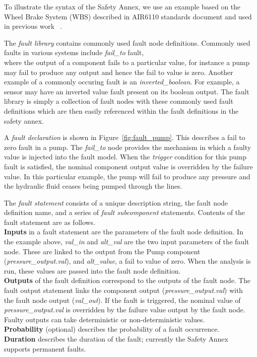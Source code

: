 To illustrate the syntax of the Safety Annex, we use an example based on the Wheel Brake System (WBS) described in AIR6110 standards document and used in  previous work ~\cite{Stewart17:IMBSA, AIR6110}.

The \textit{fault library} contains commonly used fault node definitions. Commonly used faults in various systems include \textit{fail\_to} fault, \\where the output of a component fails to a particular value, for instance a pump may fail to produce any output and hence the fail to value is zero. Another example of a commonly occuring fault is an \textit{inverted\_boolean}. For example, a sensor may have an inverted value fault present on its boolean output. The fault library is simply a collection of fault nodes with these commonly used fault definitions which are then easily referenced within the fault definitions in the safety annex. 


A \textit{fault declaration} is shown in Figure~\ref{fig:fault_pump}. This describes a fail to zero fault in a pump. The \textit{fail\_to} node provides the mechanism in which a faulty value is injected into the fault model. When the \textit{trigger} condition for this pump fault is satisfied, the nominal component output value is overridden by the failure value. In this particular example, the pump will fail to produce any pressure and the hydraulic fluid ceases being pumped through the lines.  

The \textit{fault statement} consists of a unique description string, the fault node definition name, and a series of \textit{fault subcomponent} statements. Contents of the fault statement are as follows.\\
\textbf{Inputs} in a fault statement are the parameters of the fault node definition. In the example above, \textit{val\_in} and \textit{alt\_val} are the two input parameters of the fault node. These are linked to the output from the Pump component (\textit{pressure\_output.val}), and \textit{alt\_value}, a fail to value of zero. When the analysis is run, these values are passed into the fault node definition.\\
\textbf{Outputs} of the fault definition correspond to the outputs of the fault node. The fault output statement links the component output (\textit{pressure\_output.val}) with the fault node output (\textit{val\_out}). If the fault is triggered, the nominal value of \textit{pressure\_output.val} is overridden by the failure value output by the fault node. Faulty outputs can take deterministic or non-deterministic values. \\
\textbf{Probability} (optional) describes the probability of a fault occurrence.\\
\textbf{Duration} describes the duration of the fault; currently the Safety Annex supports permanent faults.\\

